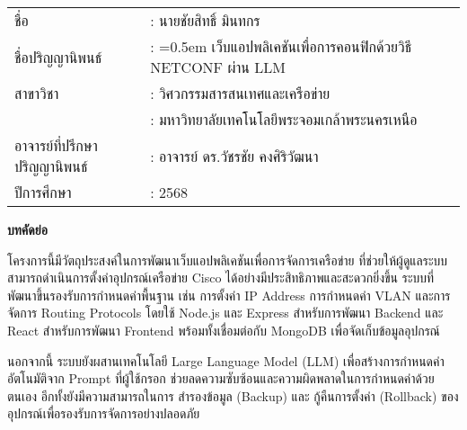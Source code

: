 {}
\begin{tabularx}{\textwidth}{lX}
ชื่อ                           & : นายชัยสิทธิ์ มินทกร         %
\\
ชื่อปริญญานิพนธ์                  & : \hangindent=0.5em          %
                                เว็บแอปพลิเคชันเพื่อการคอนฟิกด้วยวิธี NETCONF ผ่าน LLM
\\
สาขาวิชา                       & : วิศวกรรมสารสนเทศและเครือข่าย %
\\
                             & : มหาวิทยาลัยเทคโนโลยีพระจอมเกล้าพระนครเหนือ
\\
อาจารย์ที่ปรึกษาปริญญานิพนธ์        & : อาจารย์ ดร.วัชรชัย คงศิริวัฒนา   %
\\
ปีการศึกษา                     & : 2568     %
\end{tabularx}

\vspace{5mm}
\begin{center}\textbf{บทคัดย่อ}\end{center}
\hspace*{1.5em} %
โครงการนี้มีวัตถุประสงค์ในการพัฒนาเว็บแอปพลิเคชันเพื่อการจัดการเครือข่าย ที่ช่วยให้ผู้ดูแลระบบสามารถดำเนินการตั้งค่าอุปกรณ์เครือข่าย Cisco ได้อย่างมีประสิทธิภาพและสะดวกยิ่งขึ้น ระบบที่พัฒนาขึ้นรองรับการกำหนดค่าพื้นฐาน เช่น การตั้งค่า IP Address การกำหนดค่า VLAN และการจัดการ Routing Protocols โดยใช้ Node.js และ Express สำหรับการพัฒนา Backend และ React สำหรับการพัฒนา Frontend พร้อมทั้งเชื่อมต่อกับ MongoDB เพื่อจัดเก็บข้อมูลอุปกรณ์

\hspace*{1.5em} %
นอกจากนี้ ระบบยังผสานเทคโนโลยี Large Language Model (LLM) เพื่อสร้างการกำหนดค่าอัตโนมัติจาก Prompt ที่ผู้ใช้กรอก ช่วยลดความซับซ้อนและความผิดพลาดในการกำหนดค่าด้วยตนเอง อีกทั้งยังมีความสามารถในการ สำรองข้อมูล (Backup) และ กู้คืนการตั้งค่า (Rollback) ของอุปกรณ์เพื่อรองรับการจัดการอย่างปลอดภัย

